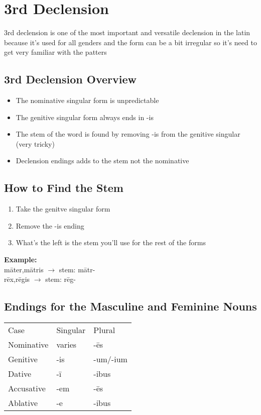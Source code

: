\section*{3rd Declension}
3rd declension is one of the most important and versatile
declension in the latin because it's used for all genders 
and the form can be a bit irregular so it's need to get 
very familiar with the patters
\subsection*{3rd Declension Overview}
\begin{itemize}
  \item The nominative singular form is unpredictable 
  \item The genitive singular form always ends in -is 
  \item The stem of the word is found by removing -is from 
  the genitive singular (very tricky)
  \item Declension endings adds to the stem not the nominative
\end{itemize}
\subsection*{How to Find the Stem}
\begin{enumerate}
  \item Take the genitve singular form 
  \item Remove the -is ending 
  \item What's the left is the stem you'll use for the rest
  of the forms
\end{enumerate}
\textbf{Example:}\\

māter,mātris $ \longrightarrow $ stem: mātr- \\
rēx,rēgis $ \longrightarrow $ stem: rēg-
\subsection*{Endings for the Masculine and Feminine Nouns}
\begin{center}
  \begin{tabular}{lll}
    Case & Singular & Plural \\ 
    Nominative & varies & -ēs \\ 
    Genitive & -is & -um/-ium \\ 
    Dative & -ī & -ibus \\ 
    Accusative & -em & -ēs \\ 
    Ablative & -e & -ibus \\ 
  \end{tabular}
\end{center}
